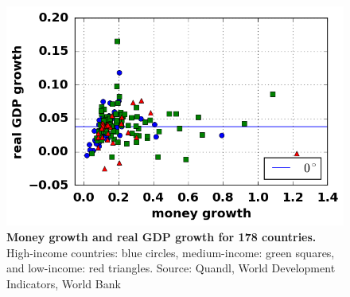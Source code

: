 \begin{figure}[h]
\caption{\label{fig_inflationGDP} \textbf{Money growth and real GDP growth for 178 countries.} High-income countries: blue circles, medium-income: green squares, and low-income: red triangles. {\tiny Source: Quandl, World Development Indicators, World Bank}}
\hspace*{-.5cm}\includegraphics[height = 7.cm]{../png/fig_moneyGDP.png}
\end{figure}